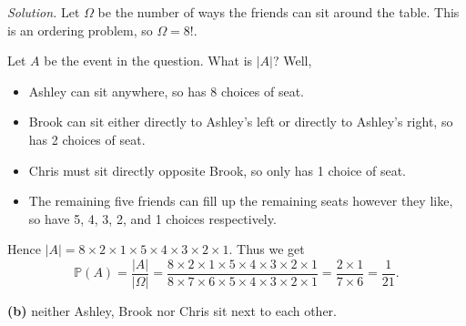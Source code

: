 \documentclass[
  a4paper,
]{book}
\providecommand{\tightlist}{%
  \setlength{\itemsep}{0pt}\setlength{\parskip}{0pt}}
\theoremstyle{definition}
\theoremstyle{definition}
\theoremstyle{definition}
\theoremstyle{definition}
\theoremstyle{remark}
\begin{document}
\begin{myanswers}
\emph{Solution.}
Let \(\Omega\) be the number of ways the friends can sit around the table. This is an ordering problem, so \(\Omega = 8!\).

Let \(A\) be the event in the question. What is \(|A|\)? Well,

\begin{itemize}
\tightlist
\item
  Ashley can sit anywhere, so has 8 choices of seat.
\item
  Brook can sit either directly to Ashley's left or directly to Ashley's right, so has 2 choices of seat.
\item
  Chris must sit directly opposite Brook, so only has 1 choice of seat.
\item
  The remaining five friends can fill up the remaining seats however they like, so have 5, 4, 3, 2, and 1 choices respectively.
\end{itemize}

Hence \(|A| = 8 \times 2 \times 1 \times 5 \times 4 \times 3 \times 2 \times 1\). Thus we get
\[ \mathbb P(A) = \frac{|A|}{|\Omega|} = \frac{8 \times 2 \times 1 \times 5 \times 4 \times 3 \times 2 \times 1}{8 \times 7 \times 6 \times 5 \times 4 \times 3 \times 2 \times 1} = \frac{2 \times 1}{7 \times 6} = \frac{1}{21} . \]

\end{myanswers}

\textbf{(b)} neither Ashley, Brook nor Chris sit next to each other.
\end{document}
